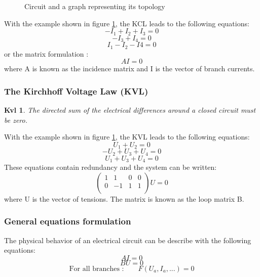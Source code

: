 \begin{figure}[h]
\centerline{
 \scalebox{0.6}{
    
 }
}
\caption{Circuit and a graph representing its topology}
\label{fig-Circuit-example}
\end{figure}
With the example shown in figure \ref{fig-Circuit-example}, the KCL leads to the following equations:
\[-I_{1}+I_{2}+I_{3}=0\]
\[-I_{3}+I_{4}=0\]
\[I_{1}-I_{2}-I{4}=0\]
or the matrix formulation :
\[AI=0\]
where A is known as the incidence matrix and I is the vector of branch currents.
\subsubsection{The Kirchhoff Voltage Law (KVL)}
\newtheorem{kvl}{Kvl}
\begin{kvl}
The directed sum of the electrical differences around a closed circuit must be zero.
\end{kvl}
With the example shown in figure \ref{fig-Circuit-example}, the KVL leads to the following
equations:
\[U_{1}+U_{2}=0\]
\[-U_{2}+U_{3}+U_{4}=0\]
\[U_{1}+U_{3}+U_{4}=0\]
These equations contain redundancy and the system can be written:
\[\left(\begin{array}{cccc}
  1&1&0&0\\
  0&-1&1&1\\
  \end{array}\right)U=0
  \]
  where U is the vector of tensions. The matrix is known as the loop matrix B.
  \subsubsection{General equations formulation}
  The physical behavior of an electrical circuit can be describe with the following equations:
  \[AI=0\]
  \[BU=0\]
  \[\textrm{For all branches :} \qquad F(U_{a},I_{a},...)=0 \]
